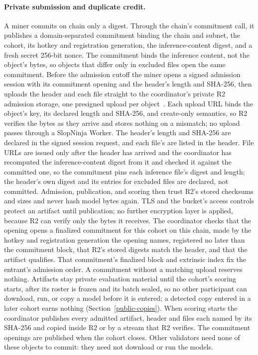 \paragraph{Private submission and duplicate credit.}
A miner commits on chain only a digest. Through the chain's commitment call, it
publishes a domain-separated commitment binding the chain and subnet, the
cohort, its hotkey and registration generation, the inference-content digest,
and a fresh secret 256-bit nonce. The commitment binds the inference content,
not the object's bytes, so objects that differ only in excluded files open the
same commitment. Before the admission cutoff the miner opens a signed admission
session with its commitment opening and the header's length and SHA-256, then
uploads the header and each file straight to the coordinator's private R2
admission storage, one presigned upload per object~\cite{cfr2}. Each upload URL
binds the object's key, its declared length and SHA-256, and create-only
semantics, so R2 verifies the bytes as they arrive and stores nothing on a
mismatch; no upload passes through a SlopNinja Worker. The header's length and
SHA-256 are declared in the signed session request, and each file's are listed
in the header. File URLs are issued only after the header has arrived and the
coordinator has recomputed the inference-content digest from it and checked it
against the committed one, so the commitment pins each inference file's digest
and length; the header's own digest and its entries for excluded files are
declared, not committed. Admission, publication, and scoring then trust R2's stored
checksums and sizes and never hash model bytes again. TLS and the bucket's
access controls protect an artifact until publication; no further encryption
layer is applied, because R2 can verify only the bytes it receives. The
coordinator checks that the opening opens a finalized commitment for this
cohort on this chain, made by the hotkey and registration generation the
opening names, registered no later than the commitment block, that R2's stored
digests match the header, and that the artifact qualifies. That commitment's
finalized block and extrinsic index fix the entrant's admission order. A
commitment without a matching upload reserves nothing. Artifacts stay private
evaluation material until the cohort's scoring starts, after its roster is
frozen and its batch sealed, so no other participant can download, run, or copy
a model before it is entered; a detected copy entered in a later cohort earns
nothing (Section~\ref{public-copies}). When scoring starts the coordinator publishes
every admitted artifact, header and files each named by its SHA-256 and copied
inside R2 or by a stream that R2 verifies. The commitment openings are
published when the cohort closes. Other validators need none of these objects
to commit: they need not download or run the models.

